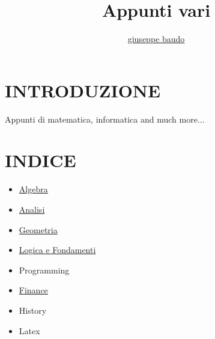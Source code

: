 \documentclass[a4paper,10pt]{article}
\title{Appunti vari}
\author{\href{http://www.baudo.hol.es}{giuseppe baudo}}
\begin{document}
\maketitle

\section{INTRODUZIONE}
Appunti di matematica, informatica and much more...

\section{INDICE}
\begin{itemize}
  \item \href{./algebra/AlgebraIndex.html}{Algebra}
  \item \href{./analisi/Analisi.html}{Analisi} 
  \item \href{./geometria/Geometria.html}{Geometria} 
  \item \href{./logica/Logics.html}{Logica e Fondamenti}
  \item Programming
  \item \href{./finance/finance.html}{Finance} 
  \item History 
  \item Latex 
  
\end{itemize}
\end{document}
